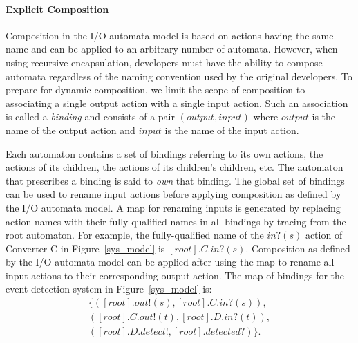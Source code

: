 \paragraph*{Explicit Composition}
Composition in the I/O automata model is based on actions having the same name and can be applied to an arbitrary number of automata.
However, when using recursive encapsulation, developers must have the ability to compose automata regardless of the naming convention used by the original developers.
To prepare for dynamic composition, we limit the scope of composition to associating a single output action with a single input action.
Such an association is called a \emph{binding} and consists of a pair $(output, input)$ where $output$ is the name of the output action and $input$ is the name of the input action.

Each automaton contains a set of bindings referring to its own actions, the actions of its children, the actions of its children's children, etc.
The automaton that prescribes a binding is said to \emph{own} that binding.
The global set of bindings can be used to rename input actions before applying composition as defined by the I/O automata model.
A map for renaming inputs is generated by replacing action names with their fully-qualified names in all bindings by tracing from the root automaton.
For example, the fully-qualified name of the $in?(s)$ action of Converter C in Figure~\ref{sys_model} is $[root].C.in?(s)$.
Composition as defined by the I/O automata model can be applied after using the map to rename all input actions to their corresponding output action.
The map of bindings for the event detection system in Figure~\ref{sys_model} is: 
\begin{displaymath}
\begin{split}
\{ ([root].out!(s), [root].C.in?(s)),\\
   ([root].C.out!(t), [root].D.in?(t)),\\
   ([root].D.detect!, [root].detected?) \}.
\end{split}
\end{displaymath}

